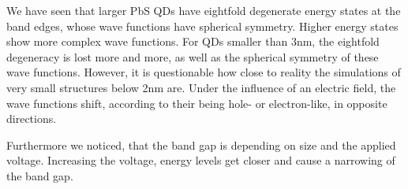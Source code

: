 We have seen that larger PbS QDs have eightfold degenerate energy states at the band edges, whose wave functions have spherical symmetry. Higher energy states show more complex wave functions. For QDs smaller than 3nm, the eightfold degeneracy is lost more and more, as well as the spherical symmetry of these wave functions. However, it is questionable how close to reality the simulations of very small structures below 2nm are.
Under the influence of an electric field, the wave functions shift, according to their being hole- or electron-like, in opposite directions.

Furthermore we noticed, that the band gap is depending on size and the applied voltage. Increasing the voltage, energy levels get closer and
cause a narrowing of the band gap.